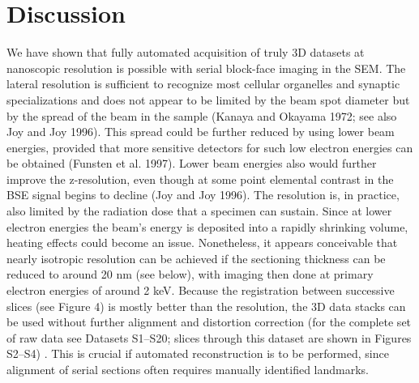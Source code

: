 \documentclass{article}
\begin{document}
\section*{Discussion}

We have shown that fully automated acquisition of truly 3D datasets at nanoscopic resolution is possible with serial block-face imaging in the SEM. The lateral resolution is sufficient to recognize most cellular organelles and synaptic specializations and does not appear to be limited by the beam spot diameter but by the spread of the beam in the sample (Kanaya and Okayama 1972; see also Joy and Joy 1996). This spread could be further reduced by using lower beam energies, provided that more sensitive detectors for such low electron energies can be obtained (Funsten et al. 1997). Lower beam energies also would further improve the z-resolution, even though at some point elemental contrast in the BSE signal begins to decline (Joy and Joy 1996). The resolution is, in practice, also limited by the radiation dose that a specimen can sustain. Since at lower electron energies the beam’s energy is deposited into a rapidly shrinking volume, heating effects could become an issue. Nonetheless, it appears conceivable that nearly isotropic resolution can be achieved if the sectioning thickness can be reduced to around 20 nm (see below), with imaging then done at primary electron energies of around 2 keV. Because the registration between successive slices (see Figure 4) is mostly better than the resolution, the 3D data stacks can be used without further alignment and distortion correction (for the complete set of raw data see Datasets S1–S20; slices through this dataset are shown in Figures S2–S4) . This is crucial if automated reconstruction is to be performed, since alignment of serial sections often requires manually identified landmarks.
\end{document}
